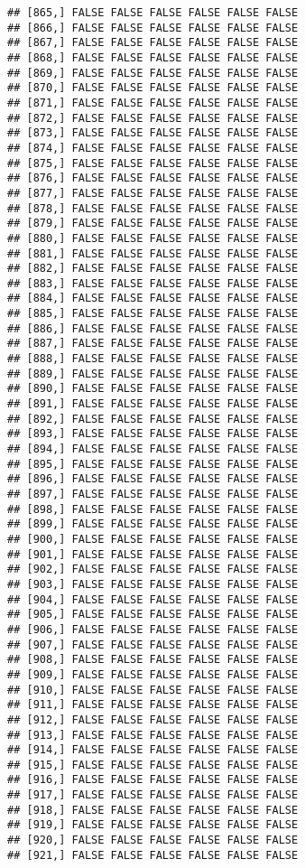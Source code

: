 \documentclass[
]{article}
\begin{document}
\begin{verbatim}
## [865,] FALSE FALSE FALSE FALSE FALSE FALSE
## [866,] FALSE FALSE FALSE FALSE FALSE FALSE
## [867,] FALSE FALSE FALSE FALSE FALSE FALSE
## [868,] FALSE FALSE FALSE FALSE FALSE FALSE
## [869,] FALSE FALSE FALSE FALSE FALSE FALSE
## [870,] FALSE FALSE FALSE FALSE FALSE FALSE
## [871,] FALSE FALSE FALSE FALSE FALSE FALSE
## [872,] FALSE FALSE FALSE FALSE FALSE FALSE
## [873,] FALSE FALSE FALSE FALSE FALSE FALSE
## [874,] FALSE FALSE FALSE FALSE FALSE FALSE
## [875,] FALSE FALSE FALSE FALSE FALSE FALSE
## [876,] FALSE FALSE FALSE FALSE FALSE FALSE
## [877,] FALSE FALSE FALSE FALSE FALSE FALSE
## [878,] FALSE FALSE FALSE FALSE FALSE FALSE
## [879,] FALSE FALSE FALSE FALSE FALSE FALSE
## [880,] FALSE FALSE FALSE FALSE FALSE FALSE
## [881,] FALSE FALSE FALSE FALSE FALSE FALSE
## [882,] FALSE FALSE FALSE FALSE FALSE FALSE
## [883,] FALSE FALSE FALSE FALSE FALSE FALSE
## [884,] FALSE FALSE FALSE FALSE FALSE FALSE
## [885,] FALSE FALSE FALSE FALSE FALSE FALSE
## [886,] FALSE FALSE FALSE FALSE FALSE FALSE
## [887,] FALSE FALSE FALSE FALSE FALSE FALSE
## [888,] FALSE FALSE FALSE FALSE FALSE FALSE
## [889,] FALSE FALSE FALSE FALSE FALSE FALSE
## [890,] FALSE FALSE FALSE FALSE FALSE FALSE
## [891,] FALSE FALSE FALSE FALSE FALSE FALSE
## [892,] FALSE FALSE FALSE FALSE FALSE FALSE
## [893,] FALSE FALSE FALSE FALSE FALSE FALSE
## [894,] FALSE FALSE FALSE FALSE FALSE FALSE
## [895,] FALSE FALSE FALSE FALSE FALSE FALSE
## [896,] FALSE FALSE FALSE FALSE FALSE FALSE
## [897,] FALSE FALSE FALSE FALSE FALSE FALSE
## [898,] FALSE FALSE FALSE FALSE FALSE FALSE
## [899,] FALSE FALSE FALSE FALSE FALSE FALSE
## [900,] FALSE FALSE FALSE FALSE FALSE FALSE
## [901,] FALSE FALSE FALSE FALSE FALSE FALSE
## [902,] FALSE FALSE FALSE FALSE FALSE FALSE
## [903,] FALSE FALSE FALSE FALSE FALSE FALSE
## [904,] FALSE FALSE FALSE FALSE FALSE FALSE
## [905,] FALSE FALSE FALSE FALSE FALSE FALSE
## [906,] FALSE FALSE FALSE FALSE FALSE FALSE
## [907,] FALSE FALSE FALSE FALSE FALSE FALSE
## [908,] FALSE FALSE FALSE FALSE FALSE FALSE
## [909,] FALSE FALSE FALSE FALSE FALSE FALSE
## [910,] FALSE FALSE FALSE FALSE FALSE FALSE
## [911,] FALSE FALSE FALSE FALSE FALSE FALSE
## [912,] FALSE FALSE FALSE FALSE FALSE FALSE
## [913,] FALSE FALSE FALSE FALSE FALSE FALSE
## [914,] FALSE FALSE FALSE FALSE FALSE FALSE
## [915,] FALSE FALSE FALSE FALSE FALSE FALSE
## [916,] FALSE FALSE FALSE FALSE FALSE FALSE
## [917,] FALSE FALSE FALSE FALSE FALSE FALSE
## [918,] FALSE FALSE FALSE FALSE FALSE FALSE
## [919,] FALSE FALSE FALSE FALSE FALSE FALSE
## [920,] FALSE FALSE FALSE FALSE FALSE FALSE
## [921,] FALSE FALSE FALSE FALSE FALSE FALSE

\end{verbatim}
\end{document}
